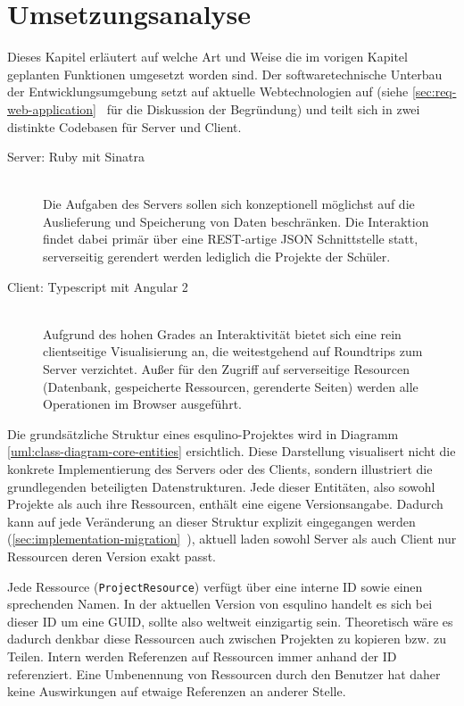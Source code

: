 \section{Umsetzungsanalyse}
\label{sec:implementation-analysis}

Dieses Kapitel erläutert auf welche Art und Weise die im vorigen Kapitel geplanten Funktionen umgesetzt worden sind. Der softwaretechnische Unterbau der Entwicklungsumgebung setzt auf aktuelle Webtechnologien auf (siehe \ref{sec:req-web-application}~ für die Diskussion der Begründung) und teilt sich in zwei distinkte Codebasen für Server und Client.

\begin{description}
\item[Server: Ruby mit Sinatra] \hfill\\
  Die Aufgaben des Servers sollen sich konzeptionell möglichst auf die Auslieferung und Speicherung von Daten beschränken. Die Interaktion findet dabei primär über eine REST-artige JSON Schnittstelle statt, serverseitig gerendert werden lediglich die Projekte der Schüler.
\item[Client: Typescript mit Angular 2] \hfill\\
  Aufgrund des hohen Grades an Interaktivität bietet sich eine rein clientseitige Visualisierung an, die weitestgehend auf Roundtrips zum Server verzichtet. Außer für den Zugriff auf serverseitige Resourcen (Datenbank, gespeicherte Ressourcen, gerenderte Seiten) werden alle Operationen im Browser ausgeführt.
\end{description}

Die grundsätzliche Struktur eines esqulino-Projektes wird in Diagramm \ref{uml:class-diagram-core-entities} ersichtlich. Diese Darstellung visualisert nicht die konkrete Implementierung des Servers oder des Clients, sondern illustriert die grundlegenden beteiligten Datenstrukturen. Jede dieser Entitäten, also sowohl Projekte als auch ihre Ressourcen, enthält eine eigene Versionsangabe. Dadurch kann auf jede Veränderung an dieser Struktur explizit eingegangen werden (\ref{sec:implementation-migration}~), aktuell laden sowohl Server als auch Client nur Ressourcen deren Version exakt passt.

Jede Ressource (\lstinline{ProjectResource}) verfügt über eine interne ID sowie einen sprechenden Namen. In der aktuellen Version von esqulino handelt es sich bei dieser ID um eine GUID, sollte also weltweit einzigartig sein. Theoretisch wäre es dadurch denkbar diese Ressourcen auch zwischen Projekten zu kopieren bzw. zu Teilen. Intern werden Referenzen auf Ressourcen immer anhand der ID referenziert. Eine Umbenennung von Ressourcen durch den Benutzer hat daher keine Auswirkungen auf etwaige Referenzen an anderer Stelle.

